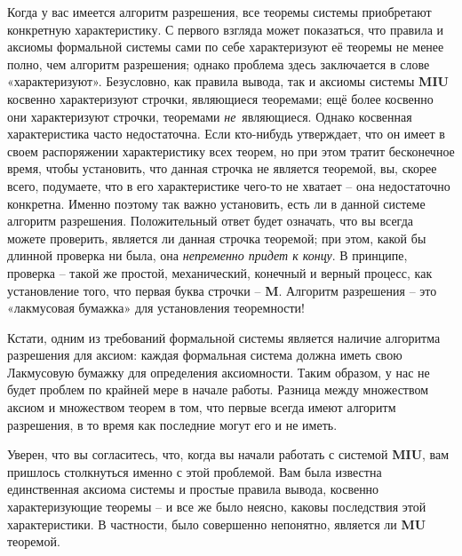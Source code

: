 \documentclass[../main.tex]{subfiles}
\begin{document}
Когда у вас имеется алгоритм разрешения, все теоремы системы приобретают конкретную характеристику. С первого взгляда может показаться, что правила и аксиомы формальной системы сами по себе характеризуют её теоремы не менее полно, чем алгоритм разрешения; однако проблема здесь заключается в слове «характеризуют». Безусловно, как правила вывода, так и аксиомы системы \textbf{MIU} косвенно характеризуют строчки, являющиеся теоремами; ещё более косвенно они характеризуют строчки, теоремами \emph{не}~являющиеся. Однако косвенная характеристика часто недостаточна. Если кто-нибудь утверждает, что он имеет в своем распоряжении характеристику всех теорем, но при этом тратит бесконечное время, чтобы установить, что данная строчка не является теоремой, вы, скорее всего, подумаете, что в его характеристике чего-то не хватает \--- она недостаточно конкретна. Именно поэтому так важно установить, есть ли в данной системе алгоритм разрешения. Положительный ответ будет означать, что вы всегда можете проверить, является ли данная строчка теоремой; при этом, какой бы длинной проверка ни была, она \emph{непременно придет к концу}. В принципе, проверка \--- такой же простой, механический, конечный и верный процесс, как установление того, что первая буква строчки \--- \textbf{M}. Алгоритм разрешения \--- это «лакмусовая бумажка» для установления теоремности!

Кстати, одним из требований формальной системы является наличие алгоритма разрешения для аксиом: каждая формальная система должна иметь свою Лакмусовую бумажку для определения аксиомности. Таким образом, у нас не будет проблем по крайней мере в начале работы. Разница между множеством аксиом и множеством теорем в том, что первые всегда имеют алгоритм разрешения, в то время как последние могут его и не иметь.

Уверен, что вы согласитесь, что, когда вы начали работать с системой \textbf{MIU}, вам пришлось столкнуться именно с этой проблемой. Вам была известна единственная аксиома системы и простые правила вывода, косвенно характеризующие теоремы \--- и все же было неясно, каковы последствия этой характеристики. В частности, было совершенно непонятно, является ли \textbf{MU} теоремой.
\end{document}
